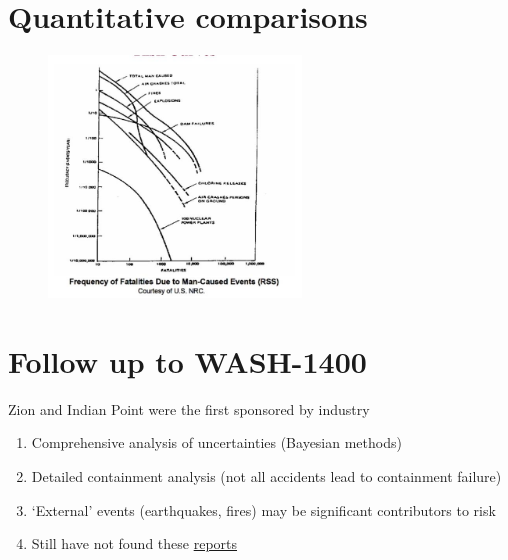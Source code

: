 \documentclass[aspectratio=1610,pdftex,dvipsnames,compress,xcolor={dvipsnames}]{beamer}
\newcommand{\acsp}{\acrshortpl} %
\begin{document}
\section{Quantitative comparisons}


\addtocounter{framenumber}{-1}
\begin{frame}{}
    \begin{figure}
        \centering
        \includegraphics[width=0.60\textwidth]{wash.farmer.jpg}
    \end{figure}
\end{frame}


\section{Follow up to WASH-1400}


\addtocounter{framenumber}{-1}
\begin{frame}{Zion and Indian Point were the first \acsp{pra} sponsored by industry}
    \begin{enumerate}[series=outerlist,topsep=0pt,itemsep=21pt,leftmargin=*,label=(\arabic*)]
        \item[]Comprehensive analysis of uncertainties (Bayesian methods)
        \item[]Detailed containment analysis (not all accidents lead to containment failure)
        \item[]`External' events (earthquakes, fires) may be significant contributors to risk
        \item[]Still have not found these \href{https://www.ans.org/news/article-3693/perspectives-from-past-nrc-commissioners/}{reports}
    \end{enumerate}
\end{frame}
\end{document}
